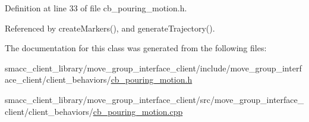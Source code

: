 Definition at line 33 of file cb\+\_\+pouring\+\_\+motion.\+h.



Referenced by create\+Markers(), and generate\+Trajectory().



The documentation for this class was generated from the following files\+:\begin{DoxyCompactItemize}
\item 
smacc\+\_\+client\+\_\+library/move\+\_\+group\+\_\+interface\+\_\+client/include/move\+\_\+group\+\_\+interface\+\_\+client/client\+\_\+behaviors/\hyperlink{cb__pouring__motion_8h}{cb\+\_\+pouring\+\_\+motion.\+h}\item 
smacc\+\_\+client\+\_\+library/move\+\_\+group\+\_\+interface\+\_\+client/src/move\+\_\+group\+\_\+interface\+\_\+client/client\+\_\+behaviors/\hyperlink{cb__pouring__motion_8cpp}{cb\+\_\+pouring\+\_\+motion.\+cpp}\end{DoxyCompactItemize}
